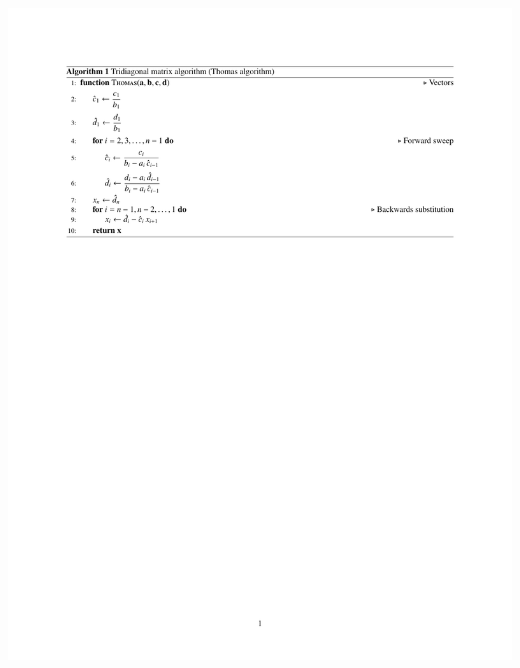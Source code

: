 \begin{frame}
\begin{center}
  \includegraphics[width=.9\linewidth]{../BurgersEquation/tex/implicit/algo_cropped.pdf}\\
\end{center}
\end{frame}


